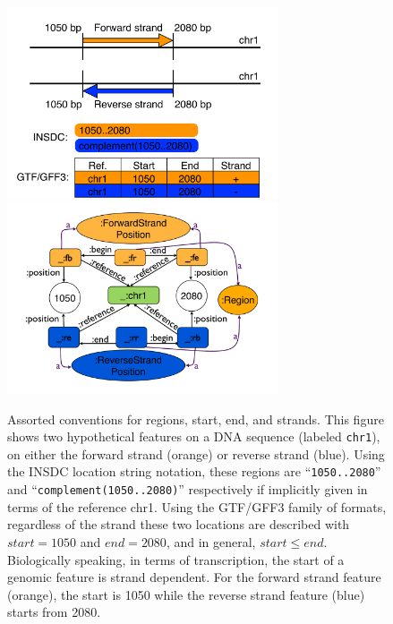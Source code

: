 \begin{figure}
\begin{center}
\includegraphics[width=8cm]{figures/figures.pdf}
\includegraphics[width=8cm]{figures/figures3.pdf}
\end{center}
\caption{Assorted conventions for regions, start, end, and strands.
This figure shows two hypothetical features on a DNA sequence
(labeled \texttt{chr1}), on either the forward strand (orange) or
reverse strand (blue).
Using the INSDC location string notation, these regions are
``\texttt{1050..2080}'' and ``\texttt{complement(1050..2080)}''
respectively if implicitly given in terms of the reference chr1.
Using the GTF/GFF3 family of formats, regardless of the
strand these two locations are described with $start = 1050$
and $end = 2080$, and in general, $start \leq end$.
Biologically speaking, in terms of transcription, the start of a genomic
feature is strand dependent.
For the forward strand feature (orange), the start is 1050
while the reverse strand feature (blue) starts from 2080.}
\label{fig:strands}
\end{figure}

